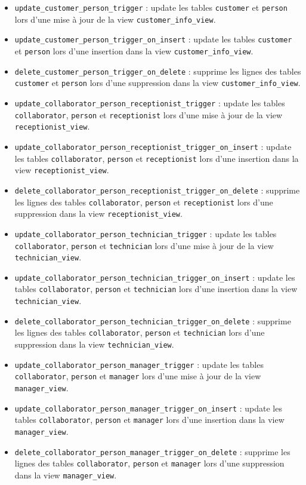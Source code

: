 \documentclass{article}
\newcommand{\ttt}{\texttt}
\begin{document}
\begin{itemize}
        \item \ttt{update\_customer\_person\_trigger} : update les tables \ttt{customer} et \ttt{person} lors d'une mise à jour de la view \ttt{customer\_info\_view}.
        \item \ttt{update\_customer\_person\_trigger\_on\_insert} : update les tables \ttt{customer} et \ttt{person} lors d'une insertion dans la view \ttt{customer\_info\_view}.
        \item \ttt{delete\_customer\_person\_trigger\_on\_delete} : supprime les lignes des tables \ttt{customer} et \ttt{person} lors d'une suppression dans la view \ttt{customer\_info\_view}.
        \item \ttt{update\_collaborator\_person\_receptionist\_trigger} : update les tables \ttt{collaborator}, \ttt{person} et \ttt{receptionist} lors d'une mise à jour de la view \ttt{receptionist\_view}.
        \item \ttt{update\_collaborator\_person\_receptionist\_trigger\_on\_insert} : update les tables \ttt{collaborator}, \ttt{person} et \ttt{receptionist} lors d'une insertion dans la view \ttt{receptionist\_view}.
        \item \ttt{delete\_collaborator\_person\_receptionist\_trigger\_on\_delete} : supprime les lignes des tables \ttt{collaborator}, \ttt{person} et \ttt{receptionist} lors d'une suppression dans la view \ttt{receptionist\_view}.
        \item \ttt{update\_collaborator\_person\_technician\_trigger} : update les tables \ttt{collaborator}, \ttt{person} et \ttt{technician} lors d'une mise à jour de la view \ttt{technician\_view}.
        \item \ttt{update\_collaborator\_person\_technician\_trigger\_on\_insert} : update les tables \ttt{collaborator}, \ttt{person} et \ttt{technician} lors d'une insertion dans la view \ttt{technician\_view}.
        \item \ttt{delete\_collaborator\_person\_technician\_trigger\_on\_delete} : supprime les lignes des tables \ttt{collaborator}, \ttt{person} et \ttt{technician} lors d'une suppression dans la view \ttt{technician\_view}.
        \item \ttt{update\_collaborator\_person\_manager\_trigger} : update les tables \ttt{collaborator}, \ttt{person} et \ttt{manager} lors d'une mise à jour de la view \ttt{manager\_view}.
        \item \ttt{update\_collaborator\_person\_manager\_trigger\_on\_insert} : update les tables \ttt{collaborator}, \ttt{person} et \ttt{manager} lors d'une insertion dans la view \ttt{manager\_view}.
        \item \ttt{delete\_collaborator\_person\_manager\_trigger\_on\_delete} : supprime les lignes des tables \ttt{collaborator}, \ttt{person} et \ttt{manager} lors d'une suppression dans la view \ttt{manager\_view}.
    \end{itemize}
\end{document}
